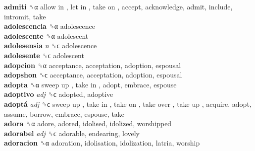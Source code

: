 \textbf{admiti} ␝α   allow in ,  let in ,  take on , accept, acknowledge, admit, include, intromit, take  \\
\textbf{adolescencia} ␝α  adolescence  \\
\textbf{adolescente} ␝α  adolescent  \\
\textbf{adolesensia} \emph{n}  ␝ϲ  adolescence  \\
\textbf{adolesente} ␝ϲ  adolescent  \\
\textbf{adopcion} ␝α  acceptance, acceptation, adoption, espousal  \\
\textbf{adopshon} ␝ϲ  acceptance, acceptation, adoption, espousal  \\
\textbf{adopta} ␝α   sweep up ,  take in , adopt, embrace, espouse  \\
\textbf{adoptivo} \emph{adj}  ␝ϲ  adopted, adoptive  \\
\textbf{adoptá} \emph{adj}  ␝ϲ   sweep up ,  take in ,  take on ,  take over ,  take up , acquire, adopt, assume, borrow, embrace, espouse, take  \\
\textbf{adora} ␝α  adore, adored, idolised, idolized, worshipped  \\
\textbf{adorabel} \emph{adj}  ␝ϲ  adorable, endearing, lovely  \\
\textbf{adoracion} ␝α  adoration, idolisation, idolization, latria, worship  \\
